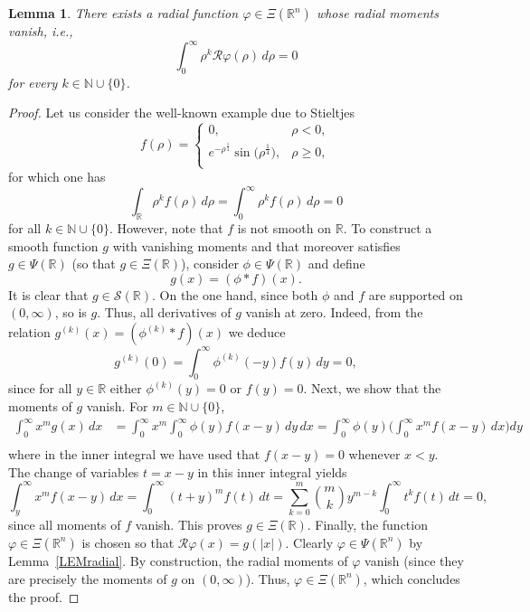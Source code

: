 \documentclass[reqno,11pt]{amsart}
\newtheorem{lemma}[theorem]{Lemma}
\theoremstyle{definition}
\def\R{\mathbb{R}}
\begin{document}
\begin{lemma}\label{LEMradialmomentsvanish}
	There exists a radial function $\varphi\in \Xi(\R^n)$ whose radial moments vanish, i.e.,
	\[
	\int_0^\infty \rho^{k} \mathcal{R}\varphi(\rho)\,d\rho=0
	\]
	for every $k\in  \mathbb{N}\cup\{0\}$.
\end{lemma}
\begin{proof}
	Let us consider the well-known example due to Stieltjes \cite[\S 55]{stieltjes}
	\[
	f(\rho) =\begin{cases}
		0,&\rho <0,\\
		 e^{-\rho^\frac{1}{4}} \sin\big( \rho^\frac{1}{4}\big),& \rho\geq 0,\\
	\end{cases}
	\]
	for which one has
	\[
		\int_{\R}\rho^k f(\rho)\, d\rho =\int_0^\infty \rho^k f(\rho)\, d\rho = 0
	\]
	for all $k\in \mathbb{N}\cup\{0\}$. However, note that $f$ is not smooth on $\mathbb{R}$. To construct a smooth function $g$ with vanishing moments and that moreover satisfies $g\in \Psi(\R)$ (so that $g\in \Xi(\R)$), consider $\phi\in \Psi(\R)$  and define
	\[
	g(x)= (\phi *f)(x).
	\]
	It is clear that $g\in \mathcal{S}(\R)$. On the one hand, since both $\phi$ and $f$ are supported on $(0,\infty)$, so is $g$. Thus, all derivatives of $g$ vanish at zero. Indeed, from the relation $g^{(k)}(x)=(\phi^{(k)}*f)(x) $ we deduce
	\[
	g^{(k)}(0) =\int_0^\infty \phi^{(k)}(-y)f(y)\,dy=0,
	\]
	since for all $y\in\R$ either $\phi^{(k)}(y)=0$ or $f(y)=0$. Next, we show that the moments of $g$ vanish. For $m\in \mathbb{N}\cup\{0\}$,
\begin{align*}
	\int_0^\infty x^m g(x)\,dx
	&=\int_0^\infty x^m\int_0^\infty \phi(y)f(x-y)\,dy\,dx =\int_0^\infty \phi(y)\bigg(\int_0^\infty x^m f(x-y)\,dx\bigg)dy\\
\end{align*}
where in the inner integral we have used that $f(x-y)=0$ whenever $x<y$. The change of variables $t=x-y$ in this inner integral yields
\[
\int_y^\infty x^m f(x-y)\,dx = \int_0^\infty (t+y)^m f(t)\,dt=\sum_{k=0}^m \binom{m}{k} y^{m-k}\int_0^\infty t^k f(t)\,dt=0,
\]
since all moments of $f$ vanish. This proves $g\in \Xi(\R)$. Finally, the function $\varphi\in \Xi(\R^n)$ is chosen so that $\mathcal{R}\varphi (x) =g(|x|)$. Clearly $\varphi\in \Psi(\R^n)$ by Lemma~\ref{LEMradial}. By construction, the radial moments of $\varphi$ vanish (since they are precisely the moments of $g$ on $(0,\infty)$). Thus, $\varphi\in \Xi(\R^n)$, which concludes the proof.
\end{proof}	
\end{document}
